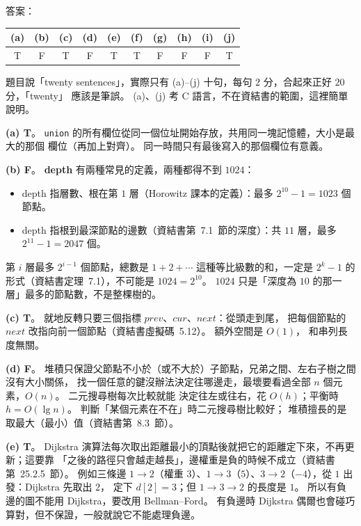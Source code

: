 \begin{pastsoln}
答案：
\begin{center}
\begin{tabular}{*{10}{c}}
\toprule
(a) & (b) & (c) & (d) & (e) & (f) & (g) & (h) & (i) & (j) \\
\midrule
T & F & T & F & T & T & F & F & F & T \\
\bottomrule
\end{tabular}
\end{center}
題目說「twenty sentences」，實際只有 (a)--(j) 十句，每句 $2$ 分，合起來正好 $20$ 分，「twenty」
應該是筆誤。 (a)、(j) 考 C 語言，不在資結書的範圍，這裡簡單說明。

\textbf{(a) T}。 \texttt{union} 的所有欄位從同一個位址開始存放，共用同一塊記憶體，大小是最大的那個
欄位（再加上對齊）。 同一時間只有最後寫入的那個欄位有意義。

\textbf{(b) F}。 \textbf{depth} 有兩種常見的定義，兩種都得不到 $1024$：
\begin{itemize}
\item depth 指層數、根在第 $1$ 層（Horowitz 課本的定義）：最多 $2^{10} - 1 = 1023$ 個節點。
\item depth 指根到最深節點的邊數（資結書第~7.1~節的深度）：共 $11$ 層，最多
$2^{11} - 1 = 2047$ 個。
\end{itemize}
第 $i$ 層最多 $2^{i-1}$ 個節點，總數是 $1 + 2 + \cdots$ 這種等比級數的和，一定是
$2^k - 1$ 的形式（資結書定理~7.1），不可能是 $1024 = 2^{10}$。 $1024$ 只是「深度為 $10$
的那一層」最多的節點數，不是整棵樹的。

\textbf{(c) T}。 就地反轉只要三個指標 $\mathit{prev}$、$\mathit{cur}$、$\mathit{next}$：從頭走到尾，
把每個節點的 $\mathit{next}$ 改指向前一個節點（資結書虛擬碼~5.12）。 額外空間是 $O(1)$，
和串列長度無關。

\textbf{(d) F}。 堆積只保證父節點不小於（或不大於）子節點，兄弟之間、左右子樹之間沒有大小關係，
找一個任意的鍵沒辦法決定往哪邊走，最壞要看過全部 $n$ 個元素，$O(n)$。 二元搜尋樹每次比較就能
決定往左或往右，花 $O(h)$；平衡時 $h = O(\lg n)$。 判斷「某個元素在不在」時二元搜尋樹比較好；
堆積擅長的是取最大（最小）值（資結書第~8.3~節）。

\textbf{(e) T}。 Dijkstra 演算法每次取出距離最小的頂點後就把它的距離定下來，不再更新；這要靠
「之後的路徑只會越走越長」，邊權重是負的時候不成立（資結書第~25.2.5~節）。 例如三條邊
$1 \to 2$（權重 $3$）、$1 \to 3$（$5$）、$3 \to 2$（$-4$），從 $1$ 出發：Dijkstra 先取出 $2$，
定下 $d[2] = 3$；但 $1 \to 3 \to 2$ 的長度是 $1$。 所以有負邊的圖不能用 Dijkstra，要改用
Bellman--Ford。 有負邊時 Dijkstra 偶爾也會碰巧算對，但不保證，一般就說它不能處理負邊。


\end{pastsoln}
